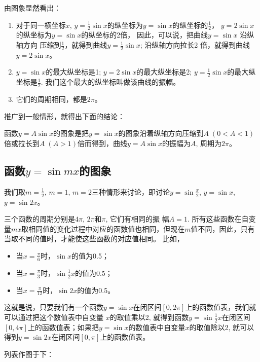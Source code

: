由图象显然看出：
\begin{enumerate}
    \item 对于同一横坐标$x$, $y=\frac{1}{2}\sin x$的纵坐标为$y=\sin x$的纵坐标的$\frac{1}{2}$，
    $y=2\sin x$的纵坐标为$y=\sin x$的纵坐标的2倍，
    因此，可以说，把曲线$y=\sin x$ 沿纵轴方向
    压缩到$\frac{1}{2}$，就得到曲线$y=\frac{1}{2}\sin x$; 沿纵轴方向拉长2
倍，就得到曲线$y=2\sin x$。

\item $y=\sin x$的最大纵坐标是1; $y=2\sin x$的最大纵坐标是2; $y=\frac{1}{2}\sin x$的最大纵坐标是$\frac{1}{2}$. 我们这个最大的纵坐标叫做该曲线的振幅。
\item 它们的周期相同，都是$2\pi$。
\end{enumerate}

推广到一般情形，就得出下面的结论：

\begin{blk}{}
    函数$y=A\sin x$的图象是把$y=\sin x$的图象沿着纵轴方向压缩到$A\; (0<A<1)$倍或拉长到$A\; (A>1)$倍而得到，曲线$y=A\sin x$的振幅为$A$, 周期为$2\pi$。
\end{blk}

\subsection{函数$y=\sin mx$的图象}

我们取$m=\frac{1}{2}$, $m=1$, $m=2$三种情形来讨论，即讨论$y=\sin\frac{x}{2}$, $y=\sin x$, $y=\sin2x$。

三个函数的周期分别是$4\pi$, $2\pi$和$\pi$, 它们有相同的振
幅$A=1$. 所有这些函数在自变量$mx$取相同值的变化过程中对应的函数值也相同，但现在$m$值不同，因此，只有当取不同的值时，才能使这些函数的对应值相同。
比如，
\begin{itemize}
    \item 当$x=\frac{\pi}{6}$时，$\sin x$的值为0.5；
    \item 当$x=\frac{\pi}{3}$时，$\sin \frac{1}{2}x$的值为0.5；
    \item 当$x=\frac{\pi}{12}$时，$\sin 2x$的值为0.5。
\end{itemize}

这就是说，只要我们有一个函数$y=\sin x$在闭区间$[0,2\pi]$上的函数值表，我们就可以通过把这个数值表中自变量
$x$的取值乘以2, 就得到函数$y=\sin\frac{1}{2}x$在闭区间$[0,4\pi]$上的函数值表；如果把$y=\sin x$的数值表中自变量$x$的取值除以2, 就可以得到$y=\sin 2x$在闭区间$[0,\pi]$上的函数值表。

列表作图于下：

